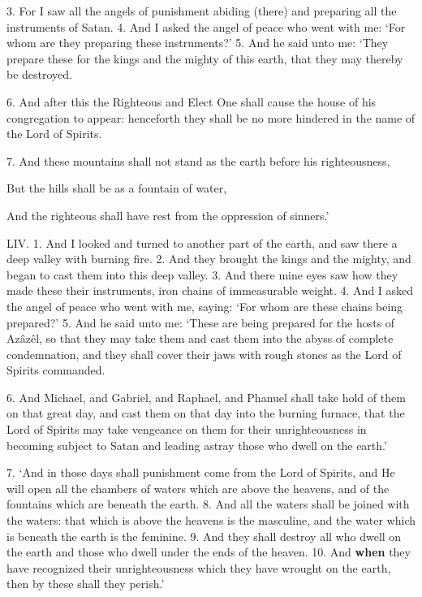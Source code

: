 3. For I saw all the angels of punishment abiding
(there) and preparing all the instruments of Satan.
4. And I asked the angel of peace who went with
me: ‘For whom are they preparing these instruments?’
5. And he said unto me: ‘They prepare
these for the kings and the mighty of this earth, that
they may thereby be destroyed.

6. And after this the Righteous and Elect One shall
cause the house of his congregation to appear:
henceforth they shall be no more hindered in the
name of the Lord of Spirits.

7. And these mountains shall not stand as the earth before his righteousness,

But the hills shall be as a fountain of water,

And the righteous shall have rest from the oppression of sinners.’

LIV. 1. And I looked and turned to another part of
the earth, and saw there a deep valley with burning
fire. 2. And they brought the kings and the mighty,
and began to cast them into this deep valley. 3. And
there mine eyes saw how they made these their
instruments, iron chains of immeasurable weight.
4. And I asked the angel of peace who went with me,
saying: ‘For whom are these chains being prepared?’
5. And he said unto me: ‘These are being prepared
for the hosts of Azâzêl, so that they may take them
and cast them into the abyss of complete condemnation,
and they shall cover their jaws with rough stones
as the Lord of Spirits commanded.

6. And Michael, and Gabriel, and Raphael, and
Phanuel shall take hold of them on that great day,
and cast them on that day into the burning furnace,
that the Lord of Spirits may take vengeance on
them for their unrighteousness in becoming subject
to Satan and leading astray those who dwell on the
earth.’


7. ‘And in those days shall punishment come from
the Lord of Spirits, and He will open all the chambers
of waters which are above the heavens, and of the
fountains which are beneath the earth. 8. And all
the waters shall be joined with the waters: that
which is above the heavens is the masculine, and
the water which is beneath the earth is the feminine.
9. And they shall destroy all who dwell on the earth
and those who dwell under the ends of the heaven.
10. And \textbf{when} they have recognized their unrighteousness
which they have wrought on the earth, then by
these shall they perish.’

